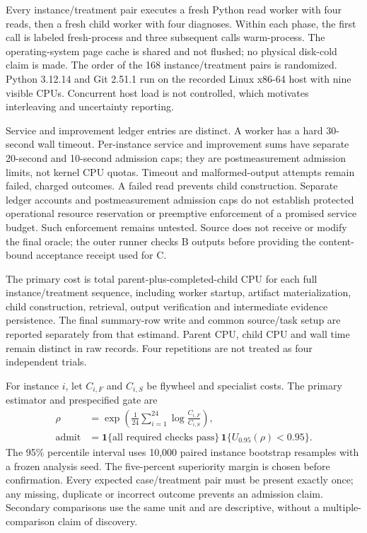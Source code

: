 \documentclass[11pt,a4paper]{article}
\begin{document}
Every instance/treatment pair executes a fresh Python read worker with four reads, then a fresh child worker with four diagnoses. Within each phase, the first call is labeled fresh-process and three subsequent calls warm-process. The operating-system page cache is shared and not flushed; no physical disk-cold claim is made. The order of the 168 instance/treatment pairs is randomized. Python 3.12.14 and Git 2.51.1 run on the recorded Linux x86-64 host with nine visible CPUs. Concurrent host load is not controlled, which motivates interleaving and uncertainty reporting.

Service and improvement ledger entries are distinct. A worker has a hard 30-second wall timeout. Per-instance service and improvement sums have separate 20-second and 10-second admission caps; they are postmeasurement admission limits, not kernel CPU quotas. Timeout and malformed-output attempts remain failed, charged outcomes. A failed read prevents child construction. Separate ledger accounts and postmeasurement admission caps do not establish protected operational resource reservation or preemptive enforcement of a promised service budget. Such enforcement remains untested. Source does not receive or modify the final oracle; the outer runner checks B outputs before providing the content-bound acceptance receipt used for C.

The primary cost is total parent-plus-completed-child CPU for each full instance/treatment sequence, including worker startup, artifact materialization, child construction, retrieval, output verification and intermediate evidence persistence. The final summary-row write and common source/task setup are reported separately from that estimand. Parent CPU, child CPU and wall time remain distinct in raw records. Four repetitions are not treated as four independent trials.

For instance $i$, let $C_{i,F}$ and $C_{i,S}$ be flywheel and specialist costs. The primary estimator and prespecified gate are
\begin{align}
 \widehat{\rho}&=\exp\!\left(\frac{1}{24}\sum_{i=1}^{24}\log\frac{C_{i,F}}{C_{i,S}}\right),\\
 \mathrm{admit}&=\mathbf{1}\{\text{all required checks pass}\}\,
                  \mathbf{1}\{U_{0.95}(\rho)<0.95\}.
\end{align}
The 95\% percentile interval uses 10,000 paired instance bootstrap resamples with a frozen analysis seed. The five-percent superiority margin is chosen before confirmation. Every expected case/treatment pair must be present exactly once; any missing, duplicate or incorrect outcome prevents an admission claim. Secondary comparisons use the same unit and are descriptive, without a multiple-comparison claim of discovery.
\end{document}
